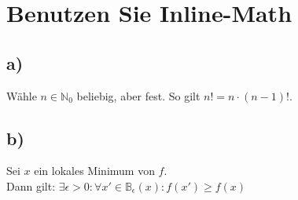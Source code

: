 \documentclass{article}
\begin{document}
\section{Benutzen Sie Inline-Math}
\subsection*{a)} Wähle \(n \in \mathbb{N}_0\) beliebig, aber fest. So gilt \(n! = n \cdot (n-1)! \).
\subsection*{b)} Sei \(x\) ein lokales Minimum von \(f\).\\
Dann gilt: \(\exists \epsilon >0 : \forall x' \in \mathbb{B}_{\epsilon} (x) : f(x') \ge f(x) \)

\printbibliography
\end{document}
